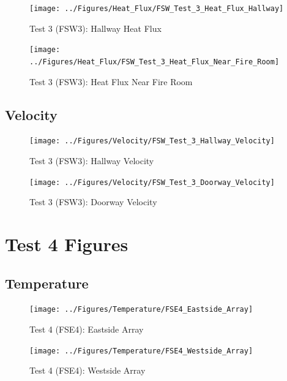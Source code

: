\documentclass[12pt,oneside]{book}
\begin{document}
\begin{figure}[!ht]
	\texttt{[image: ../Figures/Heat\_Flux/FSW\_Test\_3\_Heat\_Flux\_Hallway]}
	\caption{Test 3 (FSW3): Hallway Heat Flux}
	\label{fig:Test_3_Hallway_Heat_Flux}
\end{figure}

\begin{figure}[!ht]
	\texttt{[image: ../Figures/Heat\_Flux/FSW\_Test\_3\_Heat\_Flux\_Near\_Fire\_Room]}
	\caption{Test 3 (FSW3): Heat Flux Near Fire Room}
	\label{fig:Test_3_Heat_Flux_Near_Fire_Room}
\end{figure}

\subsection{Velocity}
\label{subsec:Velocity}

\begin{figure}[!ht]
	\texttt{[image: ../Figures/Velocity/FSW\_Test\_3\_Hallway\_Velocity]}
	\caption{Test 3 (FSW3): Hallway Velocity}
	\label{fig:Test_3_Hallway_Velocity}
\end{figure}

\begin{figure}[!ht]
	\texttt{[image: ../Figures/Velocity/FSW\_Test\_3\_Doorway\_Velocity]}
	\caption{Test 3 (FSW3): Doorway Velocity}
	\label{fig:Test_3_Doorway_Velocity}
\end{figure}

\clearpage

\section{Test 4 Figures}
\label{subsec:Test_4_Figures}

\subsection{Temperature}
\label{subsec:Temperature}

\begin{figure}[!ht]
	\texttt{[image: ../Figures/Temperature/FSE4\_Eastside\_Array]}
	\caption{Test 4 (FSE4): Eastside Array}
	\label{fig:Test_4_Eastside_Array}
\end{figure}

\begin{figure}[!ht]
	\texttt{[image: ../Figures/Temperature/FSE4\_Westside\_Array]}
	\caption{Test 4 (FSE4): Westside Array}
	\label{fig:Test_4_Westside_Array}
\end{figure}
\end{document}
